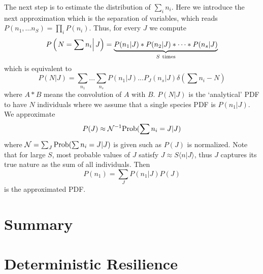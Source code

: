 \documentclass[%
 amsmath,amssymb,
 reprint,%
]{revtex4-2}
\begin{document}
The next step is to estimate the distribution of $\sum_i n_i$. Here we introduce the next approximation which is the separation of variables, which reads $P(n_1,\dots n_S)=\prod_i P(n_i)$. Thus, for every $J$ we compute 
\begin{equation}
    P\left(\left. N=\sum n_i \right| J\right) =\underbrace{P(n_1|J)*P(n_2|J)* \dots * P(n_s|J)}_{S {\rm \ times}}
\end{equation}
which is equivalent to 
\begin{equation}
     P(N|J)=\sum_{n_1} ... \sum_{n_s} P(n_1|J)...P_J(n_s|J)\delta(\sum n_i - N)
\end{equation}
where $A*B$ means the convolution of $A$ with $B$. $P(N|{J})$ is the `analytical' PDF to have $N$ individuals where we assume that a single species PDF is $P(n_1|J)$. We approximate
\begin{equation}
P(J)\approx {\cal N}^{-1} {\rm Prob}(\sum n_i=J|J)
\end{equation}
where ${\cal N}= \sum_J{\rm Prob}(\sum n_i=J|J)  $ is given such as $P(J)$ is normalized. Note that for large $S$, most probable values of $J$ satisfy $J\approx S\langle n|J\rangle $,   thus $J$ captures its true nature as the sum of all individuals. 
Then
\begin{equation}
    P(n_1) = \sum_{J}P(n_1|J) P(J)
\end{equation}
is the approximated PDF.

 



\section{Summary}

 
 \iffalse
\section{Deterministic Resilience}
\end{document}
